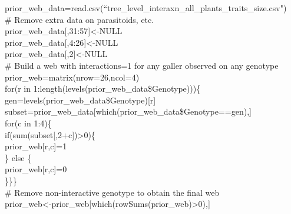 \documentclass[12pt]{article}
\begin{document}
      \vspace{12pt}
      \begin{em}
      \noindent \hspace{2pt}prior\_web\_data=read.csv(``tree\_level\_interaxn\_all\_plants\_traits\_size.csv")\\
      \vspace{4pt}
      \noindent \hspace{2pt}\# Remove extra data on parasitoids, etc.\\
      \noindent \hspace{2pt}prior\_web\_data[,31:57]\textless-NULL\\
      \noindent \hspace{2pt}prior\_web\_data[,4:26]\textless-NULL\\
      \noindent \hspace{2pt}prior\_web\_data[,2]\textless-NULL\\
      \vspace{4pt}
      \noindent \hspace{2pt}\# Build a web with interactions=1 for any galler observed on any genotype\\
      \noindent \hspace{2pt}prior\_web=matrix(nrow=26,ncol=4)\\
      \noindent \hspace{2pt}for(r in 1:length(levels(prior\_web\_data\$Genotype)))\{\\
      \hspace{4pt}gen=levels(prior\_web\_data\$Genotype)[r]\\
      \hspace{4pt}subset=prior\_web\_data[which(prior\_web\_data\$Genotype==gen),]\\
      \hspace{4pt}for(c in 1:4)\{\\
      \hspace{8pt}if(sum(subset[,2+c])\textgreater0)\{\\
      \hspace{12pt}prior\_web[r,c]=1\\
      \hspace{8pt}\} else \{\\
      \hspace{12pt}prior\_web[r,c]=0\\
      \hspace{8pt}\}\}\}\\
      \vspace{4pt}
      \noindent \hspace{2pt}\# Remove non-interactive genotype to obtain the final web\\
      \noindent \hspace{2pt}prior\_web\textless-prior\_web[which(rowSums(prior\_web)\textgreater0),]
      \end{em}
\end{document}
